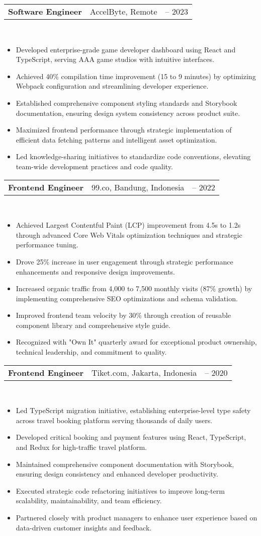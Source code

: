 \documentclass[a4paper, 11pt]{article}
\newcommand{\resumeItem}[1]{
  \item\small{
    {#1 \vspace{-2pt}}
  }
}
\newcommand{\resumeSubheading}[4]{
  \vspace{-2pt}\item
    \begin{tabularx}{0.987\textwidth}[t]{
  >{\raggedright\arraybackslash}X
  >{\centering\arraybackslash}X
  >{\raggedleft\arraybackslash}X }
      \textbf{#1} & #2 & #3 \\
    \end{tabularx}
    \textit{\small#4}\\
    \vspace{-7pt}
}
\newcommand{\resumeItemListStart}{\begin{itemize}[leftmargin=0.22in]}
\newcommand{\resumeItemListEnd}{\end{itemize}\vspace{-20pt}}
\begin{document}
        \resumeSubheading
            {Software Engineer}{AccelByte, Remote}{2022 -- 2023}{}
            \resumeItemListStart
                \resumeItem{Developed enterprise-grade game developer dashboard using React and TypeScript, serving AAA game studios with intuitive interfaces.}
                \resumeItem{Achieved 40\% compilation time improvement (15 to 9 minutes) by optimizing Webpack configuration and streamlining developer experience.}
                \resumeItem{Established comprehensive component styling standards and Storybook documentation, ensuring design system consistency across product suite.}
                \resumeItem{Maximized frontend performance through strategic implementation of efficient data fetching patterns and intelligent asset optimization.}
                \resumeItem{Led knowledge-sharing initiatives to standardize code conventions, elevating team-wide development practices and code quality.}
            \resumeItemListEnd

        \resumeSubheading
            {Frontend Engineer}{99.co, Bandung, Indonesia}{2020 -- 2022}{}
            \resumeItemListStart
                \resumeItem{Achieved Largest Contentful Paint (LCP) improvement from 4.5s to 1.2s through advanced Core Web Vitals optimization techniques and strategic performance tuning.}
                \resumeItem{Drove 25\% increase in user engagement through strategic performance enhancements and responsive design improvements.}
                \resumeItem{Increased organic traffic from 4,000 to 7,500 monthly visits (87\% growth) by implementing comprehensive SEO optimizations and schema validation.}
                \resumeItem{Improved frontend team velocity by 30\% through creation of reusable component library and comprehensive style guide.}
                \resumeItem{Recognized with "Own It" quarterly award for exceptional product ownership, technical leadership, and commitment to quality.}
            \resumeItemListEnd

        \resumeSubheading
            {Frontend Engineer}{Tiket.com, Jakarta, Indonesia}{2019 -- 2020}{}
            \resumeItemListStart
                \resumeItem{Led TypeScript migration initiative, establishing enterprise-level type safety across travel booking platform serving thousands of daily users.}
                \resumeItem{Developed critical booking and payment features using React, TypeScript, and Redux for high-traffic travel platform.}
                \resumeItem{Maintained comprehensive component documentation with Storybook, ensuring design consistency and enhanced developer productivity.}
                \resumeItem{Executed strategic code refactoring initiatives to improve long-term scalability, maintainability, and team efficiency.}
                \resumeItem{Partnered closely with product managers to enhance user experience based on data-driven customer insights and feedback.}
            \resumeItemListEnd
\end{document}
